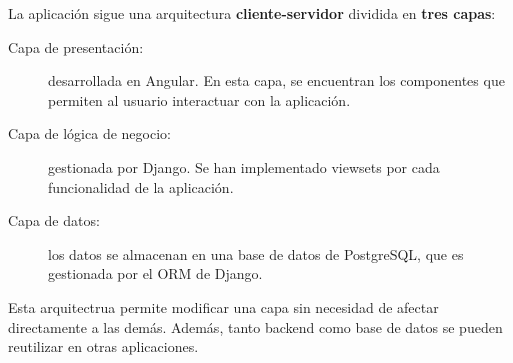 La aplicación sigue una arquitectura \textbf{cliente-servidor} \cite{arsysclientserver2025} dividida en \textbf{tres capas}: 
\begin{description}
    \item[Capa de presentación:] desarrollada en Angular. En esta capa, se encuentran los componentes que
    permiten al usuario interactuar con la aplicación. 
    \item[Capa de lógica de negocio:] gestionada por Django. Se han implementado viewsets por cada 
    funcionalidad de la aplicación.
    \item [Capa de datos:] los datos se almacenan en una base de datos de PostgreSQL, que es gestionada 
    por el ORM de Django. 
\end{description}

Esta arquitectrua permite modificar una capa sin necesidad de afectar directamente a las demás. Además,
tanto backend como base de datos se pueden reutilizar en otras aplicaciones.
